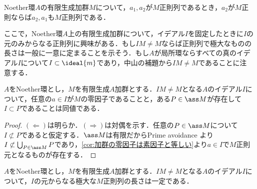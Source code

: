 \begin{cor}\label{cor:M正則なら並べ替えてOK}
	Noether環$A$の有限生成加群$M$について，$a_1,a_2$が$M$正則列であるとき，$a_2$が$M$正則ならば$a_2,a_1$も$M$正則列である．
\end{cor}

ここで，Noether環$A$上の有限生成加群について，イデアル$I$を固定したときに$I$の元のみからなる正則列に興味がある．もし$IM\neq M$ならば正則列で極大なものの長さは一般に一意に定まることを示そう．もし$A$が局所環ならすべての真のイデアル$I$について$I\subset\ideal{m}$であり，中山の補題から$IM\neq M$であることに注意する．

\begin{lem}\label{lem:depth 0とass}
	$A$をNoether環とし，$M$を有限生成$A$加群とする．$IM\neq M$となる$A$のイデアル$I$について，任意の$a\in I$が$M$の零因子であることと，ある$P\in\ass M$が存在して$I\subset P$であることは同値である．
\end{lem}

\begin{proof}
	$(\Longleftarrow)$は明らか．$(\Longrightarrow)$は対偶を示す．任意の$P\in\ass M$について$I\not\subset P$であると仮定する．$\ass M$は有限だからPrime avoidance より$I\not\subset\bigcup_{P\in\ass M}P$であり，\ref{cor:加群の零因子は素因子と等しい}より$a\in I$で$M$正則元となるものが存在する．
\end{proof}

\begin{thm}\label{thm:極大な正則列の長さは一定}
	$A$をNoether環とし，$M$を有限生成$A$加群とする．$IM\neq M$となる$A$のイデアル$I$について，$I$の元からなる極大な$M$正則列の長さは一定である．
\end{thm}

